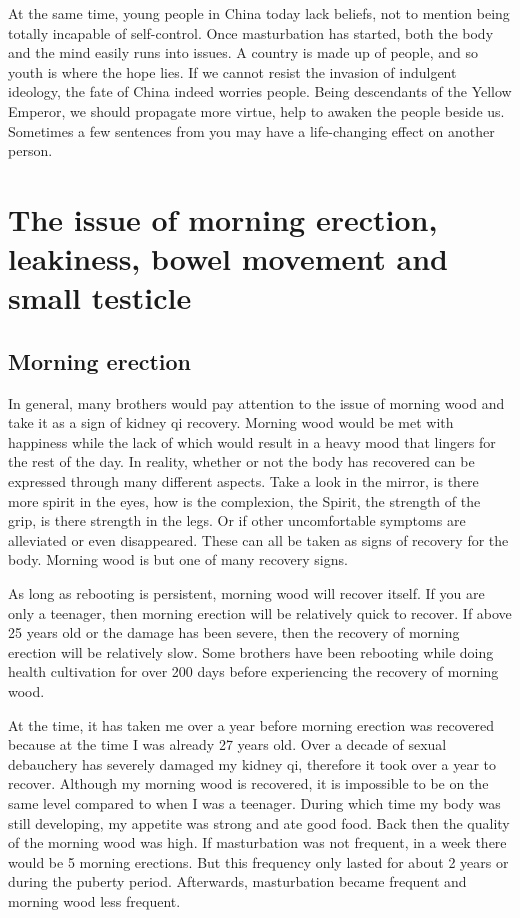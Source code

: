 \documentclass[
]{book}
\begin{document}
At the same time, young people in China today lack beliefs, not to mention being totally incapable of self-control. Once masturbation has started, both the body and the mind easily runs into issues. A country is made up of people, and so youth is where the hope lies. If we cannot resist the invasion of indulgent ideology, the fate of China indeed worries people. Being descendants of the Yellow Emperor, we should propagate more virtue, help to awaken the people beside us. Sometimes a few sentences from you may have a life-changing effect on another person.

\hypertarget{the-issue-of-morning-erection-leakiness-bowel-movement-and-small-testicle}{%
\chapter{The issue of morning erection, leakiness, bowel movement and small testicle}\label{the-issue-of-morning-erection-leakiness-bowel-movement-and-small-testicle}}

\hypertarget{morning-erection}{%
\section{Morning erection}\label{morning-erection}}

In general, many brothers would pay attention to the issue of morning wood and take it as a sign of kidney qi recovery. Morning wood would be met with happiness while the lack of which would result in a heavy mood that lingers for the rest of the day. In reality, whether or not the body has recovered can be expressed through many different aspects. Take a look in the mirror, is there more spirit in the eyes, how is the complexion, the Spirit, the strength of the grip, is there strength in the legs. Or if other uncomfortable symptoms are alleviated or even disappeared. These can all be taken as signs of recovery for the body. Morning wood is but one of many recovery signs.

As long as rebooting is persistent, morning wood will recover itself. If you are only a teenager, then morning erection will be relatively quick to recover. If above 25 years old or the damage has been severe, then the recovery of morning erection will be relatively slow. Some brothers have been rebooting while doing health cultivation for over 200 days before experiencing the recovery of morning wood.

At the time, it has taken me over a year before morning erection was recovered because at the time I was already 27 years old. Over a decade of sexual debauchery has severely damaged my kidney qi, therefore it took over a year to recover. Although my morning wood is recovered, it is impossible to be on the same level compared to when I was a teenager. During which time my body was still developing, my appetite was strong and ate good food. Back then the quality of the morning wood was high. If masturbation was not frequent, in a week there would be 5 morning erections. But this frequency only lasted for about 2 years or during the puberty period. Afterwards, masturbation became frequent and morning wood less frequent.
\end{document}
